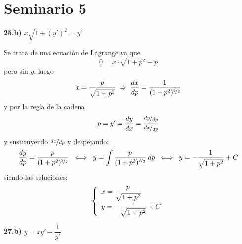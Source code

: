 \section{Seminario 5}
\begin{ejer}
    \textbf{25.b)} $x\sqrt{1+(y')^2}=y'$
\end{ejer}
\begin{sol}
Se trata de una ecuación de Lagrange ya que 
$$0=x \cdot \sqrt{1+p^2} - p$$
pero sin $y$, luego 
$$x=\dfrac{p}{\sqrt{1+p^2}} \; \Rightarrow \;\dfrac{dx}{dp}=\dfrac{1}{(1+p^2)^{\nicefrac{3}{2}}}$$
y por la regla de la cadena
$$p=y'=\dfrac{dy}{dx}=\dfrac{\nicefrac{dy}{dp}}{\nicefrac{dx}{dp}}$$
y sustituyendo $\nicefrac{dx}{dp}$ y despejando:
$$\dfrac{dy}{dp}=\dfrac{p}{(1+p^2)^{\nicefrac{3}{2}}} \; \iff \; y = \int \dfrac{p}{(1+p^2)^{\nicefrac{3}{2}}} \: dp \; \iff \; y=-\dfrac{1}{\sqrt{1+p^2}}+C $$
siendo las soluciones:
$$\left\{ \begin{array}{l}
     x=\dfrac{p}{\sqrt{1+p^2}} \\ \vspace{-5mm} \\
     y=-\dfrac{1}{\sqrt{1+p^2}}+C 
\end{array}\right.$$
\end{sol}
\begin{ejer}
    \textbf{27.b)} $y=xy'-\dfrac{1}{y'}$ 
\end{ejer}
